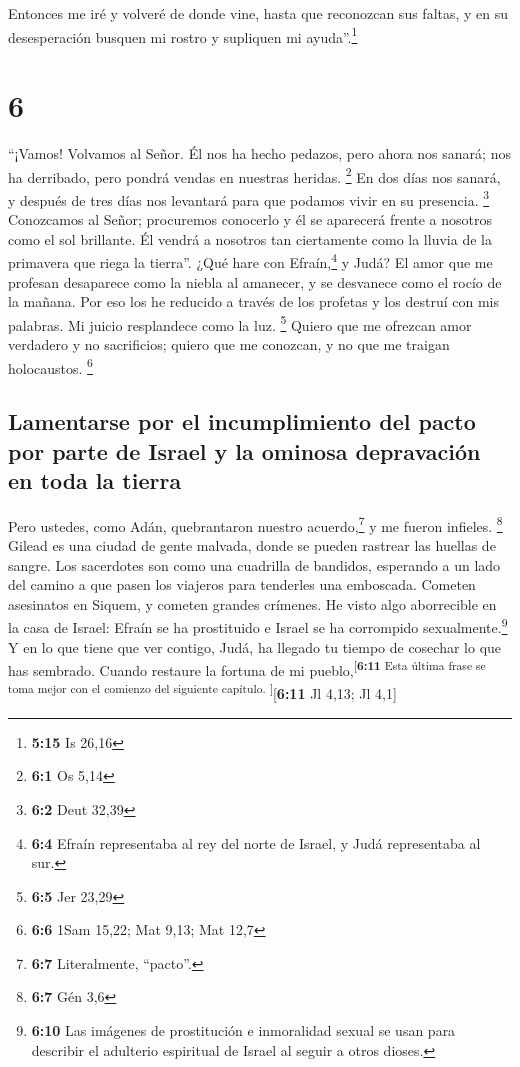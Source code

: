  Entonces me iré y volveré de donde vine, hasta que
reconozcan sus faltas, y en su desesperación busquen mi rostro y
supliquen mi ayuda''.\footnote{\textbf{5:15} Is 26,16}

\hypertarget{section-5}{%
\section{6}\label{section-5}}

 ``¡Vamos! Volvamos al Señor. Él nos ha hecho pedazos,
pero ahora nos sanará; nos ha derribado, pero pondrá vendas en nuestras
heridas. \footnote{\textbf{6:1} Os 5,14}  En dos días nos
sanará, y después de tres días nos levantará para que podamos vivir en
su presencia. \footnote{\textbf{6:2} Deut 32,39} 
Conozcamos al Señor; procuremos conocerlo y él se aparecerá frente a
nosotros como el sol brillante. Él vendrá a nosotros tan ciertamente
como la lluvia de la primavera que riega la tierra''. 
¿Qué hare con Efraín,\footnote{\textbf{6:4} Efraín representaba al rey
  del norte de Israel, y Judá representaba al sur.} y Judá? El amor que
me profesan desaparece como la niebla al amanecer, y se desvanece como
el rocío de la mañana.  Por eso los he reducido a través
de los profetas y los destruí con mis palabras. Mi juicio resplandece
como la luz. \footnote{\textbf{6:5} Jer 23,29}  Quiero que
me ofrezcan amor verdadero y no sacrificios; quiero que me conozcan, y
no que me traigan holocaustos. \footnote{\textbf{6:6} 1Sam 15,22; Mat
  9,13; Mat 12,7}

\hypertarget{lamentarse-por-el-incumplimiento-del-pacto-por-parte-de-israel-y-la-ominosa-depravaciuxf3n-en-toda-la-tierra}{%
\subsection{Lamentarse por el incumplimiento del pacto por parte de
Israel y la ominosa depravación en toda la
tierra}\label{lamentarse-por-el-incumplimiento-del-pacto-por-parte-de-israel-y-la-ominosa-depravaciuxf3n-en-toda-la-tierra}}

 Pero ustedes, como Adán, quebrantaron nuestro
acuerdo,\footnote{\textbf{6:7} Literalmente, ``pacto''.} y me fueron
infieles. \footnote{\textbf{6:7} Gén 3,6}  Gilead es una
ciudad de gente malvada, donde se pueden rastrear las huellas de sangre.
 Los sacerdotes son como una cuadrilla de bandidos,
esperando a un lado del camino a que pasen los viajeros para tenderles
una emboscada. Cometen asesinatos en Siquem, y cometen grandes crímenes.
 He visto algo aborrecible en la casa de Israel: Efraín
se ha prostituido e Israel se ha corrompido sexualmente.\footnote{\textbf{6:10}
  Las imágenes de prostitución e inmoralidad sexual se usan para
  describir el adulterio espiritual de Israel al seguir a otros dioses.}
 Y en lo que tiene que ver contigo, Judá, ha llegado tu
tiempo de cosechar lo que has sembrado. Cuando restaure la fortuna de mi
pueblo,\textsuperscript{{[}\textbf{6:11} Esta última frase se toma mejor
con el comienzo del siguiente capítulo. {]}}{[}\textbf{6:11} Jl 4,13; Jl
4,1{]}

